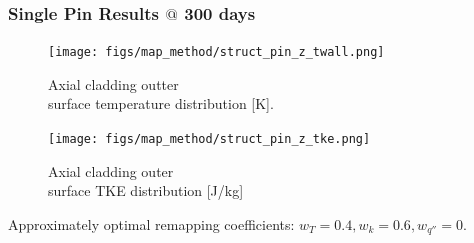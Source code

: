 \documentclass[t, pdftex]{beamer}
\begin{document}
\begin{frame}
\frametitle{Single Pin Results $@$ 300 days}
    \begin{figure}
        \centering
        \begin{minipage}{.5\textwidth}
            \centering
            \texttt{[image: figs/map\_method/struct\_pin\_z\_twall.png]}
            \caption{Axial cladding outter \\ surface temperature distribution [K].}
        \end{minipage}%
        \begin{minipage}{.5\textwidth}
            \centering
            \texttt{[image: figs/map\_method/struct\_pin\_z\_tke.png]}
            \caption{ Axial cladding outer \\ surface TKE distribution [J/kg]}
        \end{minipage}
    \end{figure}
Approximately optimal remapping coefficients: $w_T=0.4, w_k=0.6, w_{q''}=0$.  
\end{frame}


\end{document}
